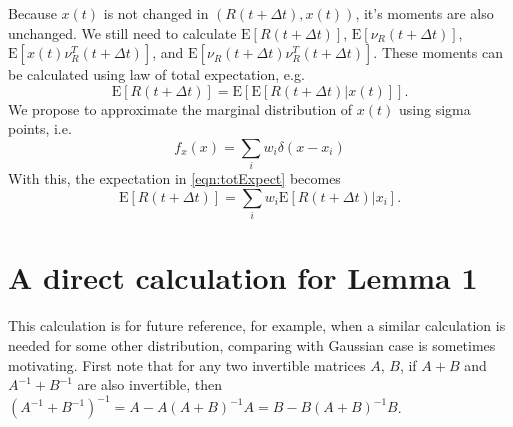 \documentclass[10pt]{article}
\newcommand{\expect}[1]{\ensuremath{\mathrm{E}\left[ #1 \right]}}
\begin{document}
Because $x(t)$ is not changed in $(R(t+\Delta t),x(t))$, it's moments are also unchanged.
We still need to calculate $\expect{R(t+\Delta t)}$, $\expect{\nu_R(t+\Delta t)}$, $\expect{x(t)\nu_R^T(t+\Delta t)}$, and $\expect{\nu_R(t+\Delta t)\nu_R^T(t+\Delta t)}$.
These moments can be calculated using law of total expectation, e.g.
\begin{equation} \label{eqn:totExpect}
	\expect{R(t+\Delta t)} = \expect{\expect{R(t+\Delta t)\left|\right.x(t)}}.
\end{equation}
We propose to approximate the marginal distribution of $x(t)$ using sigma points, i.e.
\begin{equation}
	f_x(x) = \sum_i w_i\delta(x-x_i)
\end{equation}
With this, the expectation in \eqref{eqn:totExpect} becomes
\begin{equation}
	\expect{R(t+\Delta t)} = \sum_i w_i\expect{R(t+\Delta t)\left|\right. x_i}.
\end{equation}

\appendix
\section{A direct calculation for Lemma 1}
This calculation is for future reference, for example, when a similar calculation is needed for some other distribution, comparing with Gaussian case is sometimes motivating.
First note that for any two invertible matrices $A$, $B$, if $A+B$ and $A^{-1}+B^{-1}$ are also invertible, then $(A^{-1}+B^{-1})^{-1} = A-A(A+B)^{-1}A = B-B(A+B)^{-1}B$.
\end{document}
